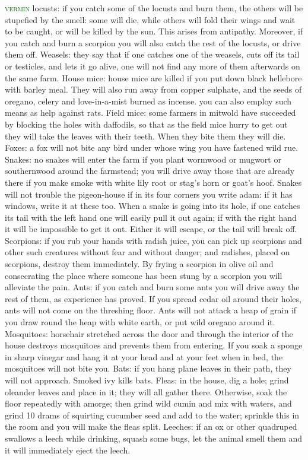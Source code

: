 \documentclass[twoside,11pt,b5paper,twocolumn]{scrbook}
\newcommand{\estcab}[1]{\textsc{\textcolor{marron}{#1}}}
\renewcommand{\paragraph}[1]{\par\noindent\markboth{#1}{#1}\estcab{\textcolor{darkgreen}{#1}}\label{#1} }
\begin{document}
\paragraph{vermin} locusts: if you catch some of the locusts and burn them, the others will be stupefied by the smell: some will die, while others will fold their wings and wait to be caught, or will be killed by the sun. This arises from antipathy. Moreover, if you catch and burn a scorpion you will also catch the rest of the locusts, or drive them off. Weasels: they say that if one catches one of the weasels, cuts off its tail or testicles, and lets it go alive, one will not find any more of them afterwards on the same farm. House mice: house mice are killed if you put down black hellebore with barley meal. They will also run away from copper sulphate, and the seeds of oregano, celery and love-in-a-mist burned as incense. you can also employ such means as help against rats. Field mice: some farmers in mitwold have succeeded by blocking the holes with daffodils, so that as the field mice hurry to get out they will take the leaves with their teeth. When they bite them they will die. Foxes: a fox will not bite any bird under whose wing you have fastened wild rue. Snakes: no snakes will enter the farm if you plant wormwood or mugwort or southernwood around the farmstead; you will drive away those that are already there if you make smoke with white lily root or stag’s horn or goat’s hoof. Snakes will not trouble the pigeon-house if in its four corners you write adam: if it has windows, write it at these too. When a snake is going into its hole, if one catches its tail with the left hand one will easily pull it out again; if with the right hand it will be impossible to get it out. Either it will escape, or the tail will break off. Scorpions: if you rub your hands with radish juice, you can pick up scorpions and other such creatures without fear and without danger; and radishes, placed on scorpions, destroy them immediately. By frying a scorpion in olive oil and consecrating the place where someone has been stung by a scorpion you will alleviate the pain. Ants: if you catch and burn some ants you will drive away the rest of them, as experience has proved. If you spread cedar oil around their holes, ants will not come on the threshing floor. Ants will not attack a heap of grain if you draw round the heap with white earth, or put wild oregano around it. Mosquitoes: horsehair stretched across the door and through the interior of the house destroys mosquitoes and prevents them from entering. If you soak a sponge in sharp vinegar and hang it at your head and at your feet when in bed, the mosquitoes will not bite you. Bats: if you hang plane leaves in their path, they will not approach. Smoked ivy kills bats. Fleas: in the house, dig a hole; grind oleander leaves and place in it; they will all gather there. Otherwise, soak the floor repeatedly with amorge; then grind wild cumin and mix with waters, and grind 10 drams of squirting cucumber seed and add to the water; sprinkle this in the room and you will make the fleas split. Leeches: if an ox or other quadruped swallows a leech while drinking, squash some bugs, let the animal smell them and it will immediately eject the leech. 
\end{document}
